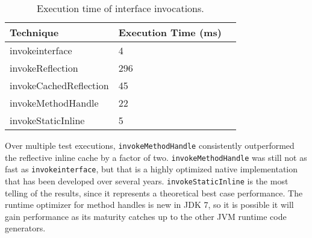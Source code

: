 \begin{table}[htbp]
  \centering
  \begin{tabular}{ | l | l | p{5cm} |}
  \hline
  \textbf{Technique} & \textbf{Execution Time (ms)} \\ \hline
  invokeinterface & 4 \\ \hline
  invokeReflection & 296 \\ \hline
  invokeCachedReflection & 45 \\ \hline
  invokeMethodHandle & 22 \\ \hline
  invokeStaticInline & 5  \\ \hline
  \end{tabular}
  \caption[Invocation Benchmarks]{Execution time of interface invocations.}
  \label{table:invocation-benchmarks}
\end{table}

Over multiple test executions, \texttt{invokeMethodHandle} consistently outperformed the reflective inline cache by a factor of two.  \texttt{invokeMethodHandle} was still not as fast as \texttt{invokeinterface}, but that is a highly optimized native implementation that has been developed over several years.  \texttt{invokeStaticInline} is the most telling of the results, since it represents a theoretical best case performance.  The runtime optimizer for method handles is new in JDK 7, so it is possible it will gain performance as its maturity catches up to the other JVM runtime code generators.

